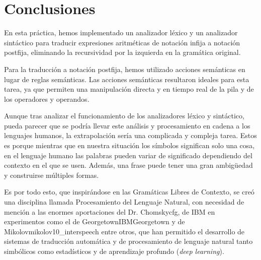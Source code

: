 \documentclass[a4paper,twocolumn]{article}
\begin{document}
    \section{Conclusiones}\label{sec:conclusiones}
    En esta práctica, hemos implementado un analizador léxico y un analizador sintáctico para traducir expresiones aritméticas de notación infija a notación postfija, eliminando la recursividad por la izquierda en la gramática original.

    Para la traducción a notación postfija, hemos utilizado acciones semánticas en lugar de reglas semánticas.
    Las acciones semánticas resultaron ideales para esta tarea, ya que permiten una manipulación directa y en tiempo real de la pila y de los operadores y operandos.

    Aunque tras analizar el funcionamiento de los analizadores léxico y sintáctico, pueda parecer que se podría llevar este análisis y procesamiento en cadena a los lenguajes humanos, la extrapolación sería una complicada y compleja tarea.
    Estos es porque mientras que en nuestra situación los símbolos significan solo una cosa, en el lenguaje humano las palabras pueden variar de significado dependiendo del contexto en el que se usen.
    Además, una frase puede tener una gran ambigüedad y construirse múltiples formas.

    Es por todo esto, que inspirándose en las Gramáticas Libres de Contexto, se creó una disciplina llamada Procesamiento del Lenguaje Natural,
    con necesidad de mención a las enormes aportaciones del Dr. Chomsky{cfg}, de IBM en experimentos como el de Georgetown{IBMGeorgetown} y de Mikolov{mikolov10\_interspeech} entre otros,
    que han permitido el desarrollo de sistemas de traducción automática y de procesamiento de lenguaje natural tanto simbólicos como estadísticos y de aprendizaje profundo (\textit{deep learning}).

    \newpage






    
    

    \clearpage


    \makeatletter
    \newcommand\appendix@section[1]{%
        \refstepcounter{section}%
        \orig@section*{Apéndice \@Alph\c@section: #1}%
        \addcontentsline{toc}{section}{Apéndice \@Alph\c@section: #1}%
    }
    \let\orig@section\section
    \g@addto@macro\appendix{\let\section\appendix@section}
    \makeatother
\end{document}
